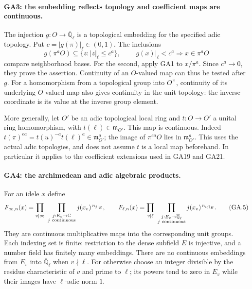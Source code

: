 \paragraph{GA3: the embedding reflects topology and coefficient maps are continuous.}
The injection $g:O\to\overline{\mathbb Q}_\ell$ is a topological
embedding for the specified adic topology. Put
$c=|g(\pi)|_\ell\in(0,1)$. The inclusions
\[
 g(\pi^aO)\subseteq\{z:|z|_\ell\leq c^a\},
 \qquad
 |g(x)|_\ell<c^a\Longrightarrow x\in\pi^aO                \tag{GA.4}
\]
compare neighborhood bases. For the second, apply GA1 to
$x/\pi^a$. Since $c^a\to0$, they prove the assertion.
Continuity of an $O$-valued map can thus be tested after $g$.
For a homomorphism from a topological group into $O^\times$,
continuity of its underlying $O$-valued map also gives continuity
in the unit topology: the inverse coordinate is its value at
the inverse group element.

More generally, let $O'$ be an adic topological local ring and
$t:O\to O'$ a unital ring homomorphism, with
$t(\ell)\in\mathfrak m_{O'}$. This map is continuous.
Indeed
$t(\pi)^{ea}=t(u)^{-a}t(\ell)^a\in\mathfrak m_{O'}^a$;
the image of $\pi^{ea}O$ lies in $\mathfrak m_{O'}^a$.
This uses the actual adic topologies, and does not assume $t$
is a local map beforehand. In particular it applies to the
coefficient extensions used in GA19 and GA21.

\paragraph{GA4: the archimedean and adic algebraic products.}
For an idele $x$ define
\[
 F_{\infty,n}(x)=
 \prod_{v\mid\infty}\ \prod_{\substack{j:E_v\to\mathbb C\\j\ {\rm continuous}}}
       j(x_v)^{\,n_{j|_E}},
 \qquad
 F_{\ell,n}(x)=
 \prod_{v\mid\ell}\ \prod_{\substack{j:E_v\to\overline{\mathbb Q}_\ell\\
                                  j\ {\rm continuous}}}
       j(x_v)^{\,n_{\iota j|_E}}.                         \tag{GA.5}
\]
They are continuous multiplicative maps into the corresponding
unit groups. Each indexing set is finite: restriction to the dense
subfield $E$ is injective, and a number field has finitely many
embeddings. There are no continuous embeddings from $E_v$ into
$\overline{\mathbb Q}_\ell$ when $v\nmid\ell$.
For otherwise choose an integer divisible by the residue
characteristic of $v$ and prime to $\ell$; its powers tend to zero
in $E_v$ while their images have $\ell$-adic norm $1$.

